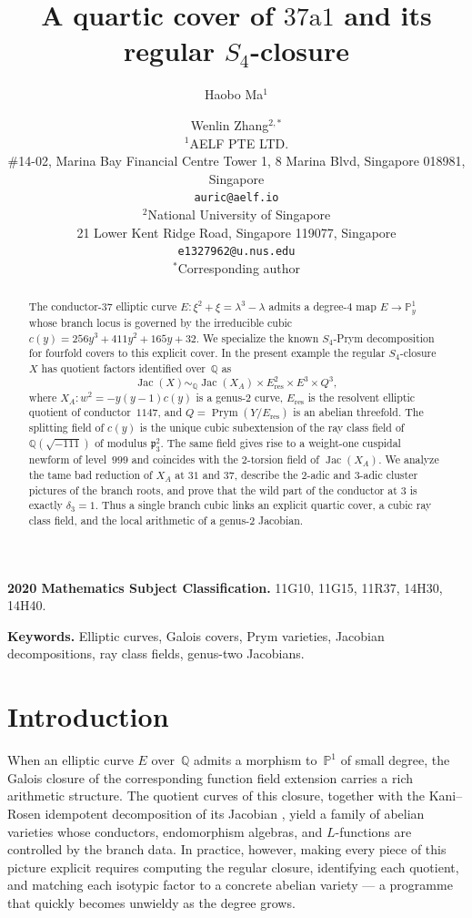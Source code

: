 \documentclass[11pt,letterpaper]{article}
\title{A quartic cover of \texorpdfstring{$37\mathrm{a}1$}{37a1} and its regular \texorpdfstring{$S_4$}{S4}-closure}
\author{%
Haobo Ma\(^{1}\) \and Wenlin Zhang\(^{2,*}\)\\[0.5em]
\small \(^{1}\)AELF PTE LTD.\\
\small \#14-02, Marina Bay Financial Centre Tower 1, 8 Marina Blvd, Singapore 018981, Singapore\\
\small \texttt{auric@aelf.io}\\
\small \(^{2}\)National University of Singapore\\
\small 21 Lower Kent Ridge Road, Singapore 119077, Singapore\\
\small \texttt{e1327962@u.nus.edu}\\
\small \(^{*}\)Corresponding author
}
\date{}
\theoremstyle{plain}
\theoremstyle{remark}
\newcommand{\QQ}{\mathbb{Q}}
\newcommand{\PP}{\mathbb{P}}
\newcommand{\Jac}{\operatorname{Jac}}
\newcommand{\Prym}{\operatorname{Prym}}
\begin{document}
\maketitle

\begin{abstract}
The conductor-\(37\) elliptic curve \(E\colon\xi^2+\xi=\lambda^3-\lambda\) admits a degree-\(4\) map \(E\to\PP^1_y\) whose branch locus is governed by the irreducible cubic \(c(y)=256y^3+411y^2+165y+32\). We specialize the known \(S_4\)-Prym decomposition for fourfold covers to this explicit cover. In the present example the regular \(S_4\)-closure~\(X\) has quotient factors identified over~\(\QQ\) as
\[
\Jac(X)\sim_{\QQ}\Jac(X_A)\times E_{\mathrm{res}}^2\times E^3\times Q^3,
\]
where \(X_A\colon w^2=-y(y-1)c(y)\) is a genus-\(2\) curve, \(E_{\mathrm{res}}\) is the resolvent elliptic quotient of conductor~\(1147\), and \(Q=\Prym(Y/E_{\mathrm{res}})\) is an abelian threefold. The splitting field of \(c(y)\) is the unique cubic subextension of the ray class field of \(\QQ(\sqrt{-111})\) of modulus \(\mathfrak p_3^2\). The same field gives rise to a weight-one cuspidal newform of level~\(999\) and coincides with the \(2\)-torsion field of \(\Jac(X_A)\). We analyze the tame bad reduction of \(X_A\) at \(31\) and \(37\), describe the \(2\)-adic and \(3\)-adic cluster pictures of the branch roots, and prove that the wild part of the conductor at \(3\) is exactly \(\delta_3=1\). Thus a single branch cubic links an explicit quartic cover, a cubic ray class field, and the local arithmetic of a genus-\(2\) Jacobian.
\end{abstract}

\noindent\textbf{2020 Mathematics Subject Classification.}
11G10, 11G15, 11R37, 14H30, 14H40.

\noindent\textbf{Keywords.}
Elliptic curves, Galois covers, Prym varieties, Jacobian decompositions, ray class fields, genus-two Jacobians.

\section{Introduction}

When an elliptic curve \(E\) over~\(\QQ\) admits a morphism to~\(\PP^1\) of small degree, the Galois closure of the corresponding function field extension carries a rich arithmetic structure. The quotient curves of this closure, together with the Kani--Rosen idempotent decomposition of its Jacobian \cite{KaniRosen1989}, yield a family of abelian varieties whose conductors, endomorphism algebras, and \(L\)-functions are controlled by the branch data. In practice, however, making every piece of this picture explicit requires computing the regular closure, identifying each quotient, and matching each isotypic factor to a concrete abelian variety --- a programme that quickly becomes unwieldy as the degree grows.
\end{document}

